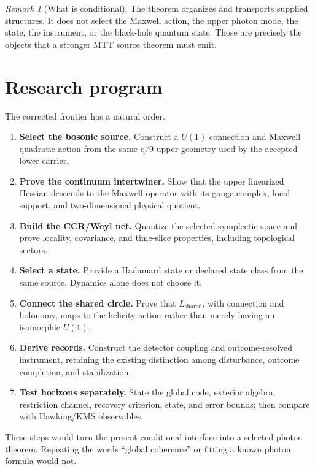 \documentclass[11pt,a4paper]{article}
\numberwithin{equation}{section}
\theoremstyle{definition}
\theoremstyle{remark}
\newtheorem{remark}[theorem]{Remark}
\begin{document}
\begin{remark}[What is conditional]
The theorem organizes and transports supplied structures.  It does not
select the Maxwell action, the upper photon mode, the state, the
instrument, or the black-hole quantum state.  Those are precisely the
objects that a stronger MTT source theorem must emit.
\end{remark}

\section{Research program}

The corrected frontier has a natural order.
\begin{enumerate}
\item \textbf{Select the bosonic source.}  Construct a \(U(1)\) connection
and Maxwell quadratic action from the same q79 upper geometry used by
the accepted lower carrier.
\item \textbf{Prove the continuum intertwiner.}  Show that the upper
linearized Hessian descends to the Maxwell operator with its gauge
complex, local support, and two-dimensional physical quotient.
\item \textbf{Build the CCR/Weyl net.}  Quantize the selected symplectic
space and prove locality, covariance, and time-slice properties,
including topological sectors.
\item \textbf{Select a state.}  Provide a Hadamard state or declared
state class from the same source.  Dynamics alone does not choose it.
\item \textbf{Connect the shared circle.}  Prove that
\(L_{\mathrm{shared}}\), with connection and holonomy, maps to the
helicity action rather than merely having an isomorphic \(U(1)\).
\item \textbf{Derive records.}  Construct the detector coupling and
outcome-resolved instrument, retaining the existing distinction among
disturbance, outcome completion, and stabilization.
\item \textbf{Test horizons separately.}  State the global code,
exterior algebra, restriction channel, recovery criterion, state, and
error bounds; then compare with Hawking/KMS observables.
\end{enumerate}

These steps would turn the present conditional interface into a selected
photon theorem.  Repeating the words ``global coherence'' or fitting a
known photon formula would not.
\end{document}
